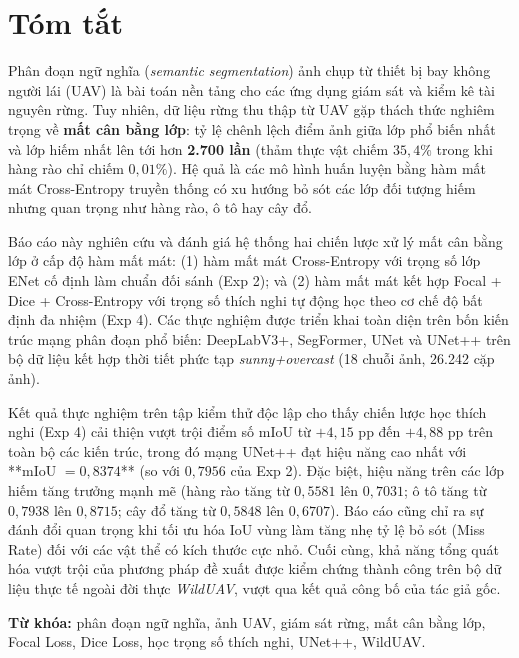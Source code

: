 \chapter*{Tóm tắt}

Phân đoạn ngữ nghĩa (\textit{semantic segmentation}) ảnh chụp từ thiết bị bay không người lái (UAV) là bài toán nền tảng cho các ứng dụng giám sát và kiểm kê tài nguyên rừng. Tuy nhiên, dữ liệu rừng thu thập từ UAV gặp thách thức nghiêm trọng về \textbf{mất cân bằng lớp}: tỷ lệ chênh lệch điểm ảnh giữa lớp phổ biến nhất và lớp hiếm nhất lên tới hơn \textbf{2.700 lần} (thảm thực vật chiếm $35{,}4\%$ trong khi hàng rào chỉ chiếm $0{,}01\%$). Hệ quả là các mô hình huấn luyện bằng hàm mất mát Cross-Entropy truyền thống có xu hướng bỏ sót các lớp đối tượng hiếm nhưng quan trọng như hàng rào, ô tô hay cây đổ.

Báo cáo này nghiên cứu và đánh giá hệ thống hai chiến lược xử lý mất cân bằng lớp ở cấp độ hàm mất mát: (1) hàm mất mát Cross-Entropy với trọng số lớp ENet cố định làm chuẩn đối sánh (Exp 2); và (2) hàm mất mát kết hợp Focal + Dice + Cross-Entropy với trọng số thích nghi tự động học theo cơ chế độ bất định đa nhiệm (Exp 4). Các thực nghiệm được triển khai toàn diện trên bốn kiến trúc mạng phân đoạn phổ biến: DeepLabV3+, SegFormer, UNet và UNet++ trên bộ dữ liệu kết hợp thời tiết phức tạp \textit{sunny+overcast} (18 chuỗi ảnh, 26.242 cặp ảnh).

Kết quả thực nghiệm trên tập kiểm thử độc lập cho thấy chiến lược học thích nghi (Exp 4) cải thiện vượt trội điểm số mIoU từ $+4{,}15$ pp đến $+4{,}88$ pp trên toàn bộ các kiến trúc, trong đó mạng UNet++ đạt hiệu năng cao nhất với **mIoU $= 0{,}8374$** (so với $0{,}7956$ của Exp 2). Đặc biệt, hiệu năng trên các lớp hiếm tăng trưởng mạnh mẽ (hàng rào tăng từ $0{,}5581$ lên $0{,}7031$; ô tô tăng từ $0{,}7938$ lên $0{,}8715$; cây đổ tăng từ $0{,}5848$ lên $0{,}6707$). Báo cáo cũng chỉ ra sự đánh đổi quan trọng khi tối ưu hóa IoU vùng làm tăng nhẹ tỷ lệ bỏ sót (Miss Rate) đối với các vật thể có kích thước cực nhỏ. Cuối cùng, khả năng tổng quát hóa vượt trội của phương pháp đề xuất được kiểm chứng thành công trên bộ dữ liệu thực tế ngoài đời thực \textit{WildUAV}, vượt qua kết quả công bố của tác giả gốc.

\vspace{0.3cm}
\noindent\textbf{Từ khóa:} phân đoạn ngữ nghĩa, ảnh UAV, giám sát rừng, mất cân bằng lớp, Focal Loss, Dice Loss, học trọng số thích nghi, UNet++, WildUAV.

